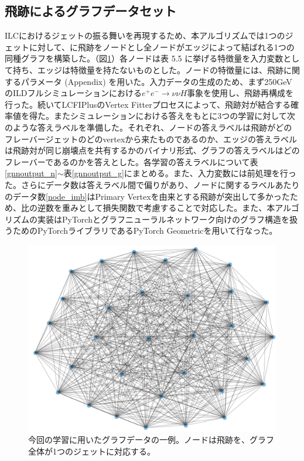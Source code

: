 \subsection{飛跡によるグラフデータセット}
ILCにおけるジェットの振る舞いを再現するため、本アルゴリズムでは1つのジェットに対して、に飛跡をノードとし全ノードがエッジによって結ばれる1つの同種グラフを構築した。（図\ref{1graph}）各ノードは表 5.5%
に挙げる特徴量を入力変数として持ち、エッジは特徴量を持たないものとした。ノードの特徴量には、飛跡に関するパラメータ (Appendix) を用いた。入力データの生成のため、まず250GeVのILDフルシミュレーションにおける$e^+e^- \rightarrow \nu \nu H$事象を使用し、飛跡再構成を行った。続いてLCFIPlusのVertex Fitterプロセスによって、飛跡対が結合する確率値を得た。またシミュレーションにおける答えをもとに3つの学習に対して次のような答えラベルを準備した。それぞれ、ノードの答えラベルは飛跡がどのフレーバージェットのどのvertexから来たものであるのか、エッジの答えラベルは飛跡対が同じ崩壊点を共有するかのバイナリ形式、グラフの答えラベルはどのフレーバーであるのかを答えとした。各学習の答えラベルについて表\ref{gnnoutput_n}$\sim$表\ref{gnnoutput_g}にまとめる。また、入力変数には前処理を行った。さらにデータ数は答えラベル間で偏りがあり、ノードに関するラベルあたりのデータ数\ref{node_imb}はPrimary Vertexを由来とする飛跡が突出して多かったため、比の逆数を重みとして損失関数で考慮することで対応した。また、本アルゴリズムの実装はPyTorchとグラフニューラルネットワーク向けのグラフ構造を扱うためのPyTorchライブラリであるPyTorch Geometricを用いて行なった。
\begin{figure}[H]
	\begin{center}
 \includegraphics[keepaspectratio, scale=0.5]
 	{Figure/Flavortagging/graphexample.png}
 		\caption{今回の学習に用いたグラフデータの一例。ノードは飛跡を、グラフ全体が1つのジェットに対応する。}
 		\label{1graph}
	\end{center}
\end{figure}

